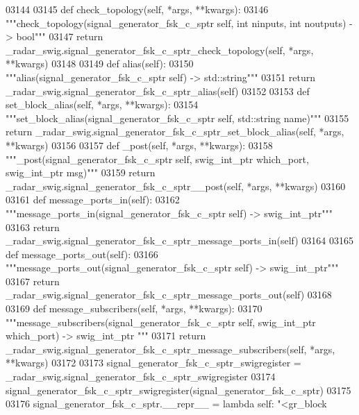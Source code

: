 \begin{DoxyCode}
{{{{{{{{{{{03144 
03145     \textcolor{keyword}{def }check_topology(self, *args, **kwargs):
03146         \textcolor{stringliteral}{"""check\_topology(signal\_generator\_fsk\_c\_sptr self, int ninputs, int noutputs) -> bool"""}
03147         \textcolor{keywordflow}{return} \_radar\_swig.signal\_generator\_fsk\_c\_sptr\_check\_topology(self, *args, **kwargs)
03148 
03149     \textcolor{keyword}{def }alias(self):
03150         \textcolor{stringliteral}{"""alias(signal\_generator\_fsk\_c\_sptr self) -> std::string"""}
03151         \textcolor{keywordflow}{return} \_radar\_swig.signal\_generator\_fsk\_c\_sptr\_alias(self)
03152 
03153     \textcolor{keyword}{def }set_block_alias(self, *args, **kwargs):
03154         \textcolor{stringliteral}{"""set\_block\_alias(signal\_generator\_fsk\_c\_sptr self, std::string name)"""}
03155         \textcolor{keywordflow}{return} \_radar\_swig.signal\_generator\_fsk\_c\_sptr\_set\_block\_alias(self, *args, **kwargs)
03156 
03157     \textcolor{keyword}{def }_post(self, *args, **kwargs):
03158         \textcolor{stringliteral}{"""\_post(signal\_generator\_fsk\_c\_sptr self, swig\_int\_ptr which\_port, swig\_int\_ptr msg)"""}
03159         \textcolor{keywordflow}{return} \_radar\_swig.signal\_generator\_fsk\_c\_sptr\_\_post(self, *args, **kwargs)
03160 
03161     \textcolor{keyword}{def }message_ports_in(self):
03162         \textcolor{stringliteral}{"""message\_ports\_in(signal\_generator\_fsk\_c\_sptr self) -> swig\_int\_ptr"""}
03163         \textcolor{keywordflow}{return} \_radar\_swig.signal\_generator\_fsk\_c\_sptr\_message\_ports\_in(self)
03164 
03165     \textcolor{keyword}{def }message_ports_out(self):
03166         \textcolor{stringliteral}{"""message\_ports\_out(signal\_generator\_fsk\_c\_sptr self) -> swig\_int\_ptr"""}
03167         \textcolor{keywordflow}{return} \_radar\_swig.signal\_generator\_fsk\_c\_sptr\_message\_ports\_out(self)
03168 
03169     \textcolor{keyword}{def }message_subscribers(self, *args, **kwargs):
03170         \textcolor{stringliteral}{"""message\_subscribers(signal\_generator\_fsk\_c\_sptr self, swig\_int\_ptr which\_port) -> swig\_int\_ptr
      """}
03171         \textcolor{keywordflow}{return} \_radar\_swig.signal\_generator\_fsk\_c\_sptr\_message\_subscribers(self, *args, **kwargs)
03172 
03173 signal\_generator\_fsk\_c\_sptr\_swigregister = \_radar\_swig.signal\_generator\_fsk\_c\_sptr\_swigregister
03174 signal_generator_fsk_c_sptr_swigregister(signal\_generator\_fsk\_c\_sptr)
03175 
03176 signal\_generator\_fsk\_c\_sptr.\_\_repr\_\_ = \textcolor{keyword}{lambda} self: \textcolor{stringliteral}{"<gr\_block %
}}}}}}}}}}}}
\end{DoxyCode}
